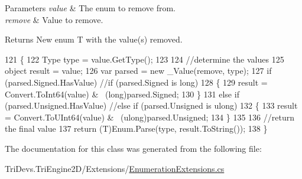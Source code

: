 \begin{DoxyParams}{Parameters}
{\em value} & The enum to remove from.\\
\hline
{\em remove} & Value to remove.\\
\hline
\end{DoxyParams}
\begin{DoxyReturn}{Returns}
New enum T with the value(s) removed.
\end{DoxyReturn}

\begin{DoxyCode}
121         \{
122             Type type = value.GetType();
123 
124             \textcolor{comment}{//determine the values}
125             \textcolor{keywordtype}{object} result = value;
126             var parsed = \textcolor{keyword}{new} \_Value(\textcolor{keyword}{remove}, type);
127             \textcolor{keywordflow}{if} (parsed.Signed.HasValue) \textcolor{comment}{//if (parsed.Signed is long)}
128             \{
129                 result = Convert.ToInt64(value) & ~(long)parsed.Signed;
130             \}
131             \textcolor{keywordflow}{else} \textcolor{keywordflow}{if} (parsed.Unsigned.HasValue) \textcolor{comment}{//else if (parsed.Unsigned is ulong)}
132             \{
133                 result = Convert.ToUInt64(value) & ~(ulong)parsed.Unsigned;
134             \}
135 
136             \textcolor{comment}{//return the final value}
137             \textcolor{keywordflow}{return} (T)Enum.Parse(type, result.ToString());
138         \}
\end{DoxyCode}


The documentation for this class was generated from the following file\-:\begin{DoxyCompactItemize}
\item 
Tri\-Devs.\-Tri\-Engine2\-D/\-Extensions/\hyperlink{_enumeration_extensions_8cs}{Enumeration\-Extensions.\-cs}\end{DoxyCompactItemize}
